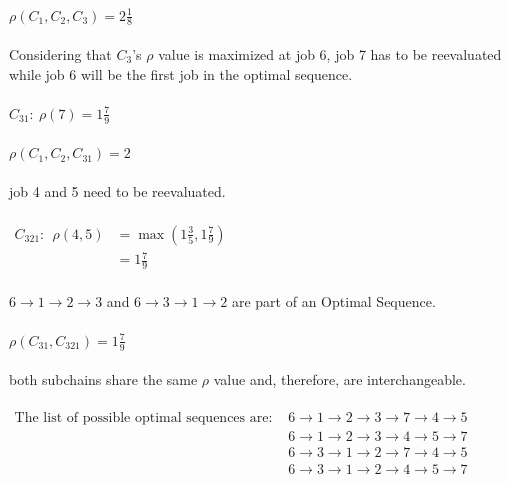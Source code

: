\documentclass[a4paper, fleqn]{article}
\begin{document}
\vspace{1pt}\\
$\rho(C_1,C_2,C_3)=2\frac{1}{8}$\\
\vspace{1pt}\\
Considering that $C_3$'s $\rho$ value is maximized at job 6, job 7 has to be reevaluated while job 6 will be the first job in the optimal sequence.\\
\vspace{1pt}\\
$C_{31}:\ \rho(7)=1\frac{7}{9}$\\
\vspace{1pt}\\
$\rho(C_1,C_2,C_{31})=2$\\
\vspace{1pt}\\
job 4 and 5 need to be reevaluated.\\
\vspace{1pt}\\
$\begin{aligned}C_{321}:\ \ \rho(4,5)&=\max\left(1\frac{3}{5},1\frac{7}{9}\right)\\&=1\frac{7}{9}\end{aligned}$\\
\vspace{1pt}\\
$6\rightarrow1\rightarrow2\rightarrow3$ and $6\rightarrow3\rightarrow1\rightarrow2$ are part of an Optimal Sequence.\\
\vspace{1pt}\\
$\rho(C_{31},C_{321})=1\frac{7}{9}$\\
\vspace{1pt}\\
both subchains share the same $\rho$ value and, therefore, are interchangeable.\\
\vspace{1pt}\\
$\begin{aligned}\text{The list of possible optimal sequences are: }& 6\rightarrow1\rightarrow2\rightarrow3\rightarrow7\rightarrow4\rightarrow5\\& 6\rightarrow1\rightarrow2\rightarrow3\rightarrow4\rightarrow5\rightarrow7\\& 6\rightarrow3\rightarrow1\rightarrow2\rightarrow7\rightarrow4\rightarrow5\\& 6\rightarrow3\rightarrow1\rightarrow2\rightarrow4\rightarrow5\rightarrow7\end{aligned}$
\end{document}
